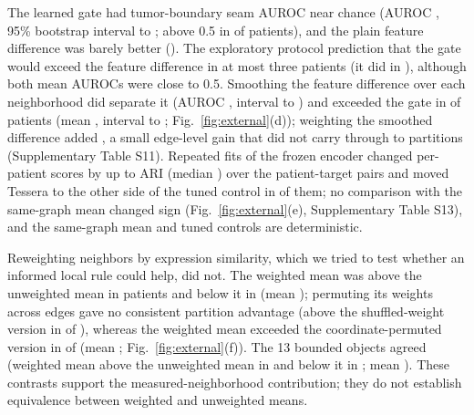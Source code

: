 \documentclass[11pt]{article}
\newcommand{\panelref}[2]{Fig.~\ref{#1}(#2)}
\begin{document}
The learned gate had tumor-boundary seam AUROC near chance (AUROC \HerBndSeamGate{}, 95\% bootstrap interval \HerBndSeamGateLo{} to \HerBndSeamGateHi{}; above 0.5 in \HerBndGateAboveChance{} of \HerPatients{} patients), and the plain feature difference was barely better (\HerBndSeamRaw{}). The exploratory protocol prediction that the gate would exceed the feature difference in at most three patients \HerHTwoVerdict{} (it did in \HerBndGateOverRaw{}), although both mean AUROCs were close to 0.5. Smoothing the feature difference over each neighborhood did separate it (AUROC \HerBndSeamSmooth{}, interval \HerBndSeamSmoothLo{} to \HerBndSeamSmoothHi{}) and exceeded the gate in \HerBndSeamSmoothGatePos{} of \HerPatients{} patients (mean \HerBndSeamSmoothGateMean{}, interval \HerBndSeamSmoothGateLo{} to \HerBndSeamSmoothGateHi{}; \panelref{fig:external}{d}); weighting the smoothed difference added \HerBndSeamSmoothPlainMean{}, a small edge-level gain that did not carry through to partitions (Supplementary Table S11). Repeated fits of the frozen encoder changed per-patient scores by up to \RepMaxRange{} ARI (median \RepMedianRange{}) over the \RepPairs{} patient-target pairs and moved Tessera to the other side of the tuned control in \RepSignChangesControl{} of them; no comparison with the same-graph mean changed sign (\panelref{fig:external}{e}, Supplementary Table S13), and the same-graph mean and tuned controls are deterministic.

Reweighting neighbors by expression similarity, which we tried to test whether an informed local rule could help, did not. The weighted mean was above the unweighted mean in \HerBndEUSixPos{} patients and below it in \HerBndEUSixNeg{} (mean \HerBndEUSixMean{}); permuting its weights across edges gave no consistent partition advantage (above the shuffled-weight version in \HerBndEShufPos{} of \HerPatients{}), whereas the weighted mean exceeded the coordinate-permuted version in \HerBndECoordPos{} of \HerPatients{} (mean \HerBndECoordMean{}; \panelref{fig:external}{f}). The 13 bounded objects agreed (weighted mean above the unweighted mean in \DevAllThirteenEMeanPos{} and below it in \DevAllThirteenEMeanNeg{}; mean \DevAllThirteenEMeanMean{}). These contrasts support the measured-neighborhood contribution; they do not establish equivalence between weighted and unweighted means.
\end{document}
